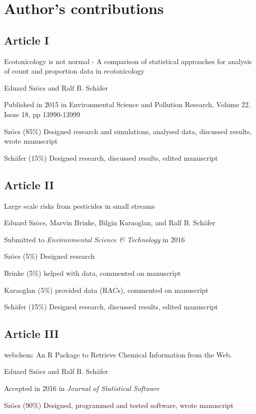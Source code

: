 \chapter{Author's contributions}

\begin{sloppypar}
\section*{Article I}
\small
\begin{description}
    \setlength\itemsep{0.3em}
	\item[Title:] Ecotoxicology is not normal - A comparison of statistical approaches for analysis of count and proportion data in ecotoxicology
	\item[Authors:] Eduard Szöcs and Ralf B. Schäfer
	\item[Status:] Published in 2015 in Environmental Science and Pollution Research, Volume 22, Issue 18, pp 13990-13999
	\item[Contributions:] Szöcs (85\%) Designed research and simulations, analysed data, discussed results, wrote manuscript 

	Schäfer (15\%) Designed research, discussed results, edited manuscript
\end{description}
\normalsize


\section*{Article II}
\small
\begin{description}
    \setlength\itemsep{0.3em}
	\item[Title:] Large scale risks from pesticides in small streams
	\item[Authors:] Eduard Szöcs, Marvin Brinke, Bilgin Karaoglan, and Ralf B. Schäfer
	\item[Status:] Submitted to \emph{Environmental Science \& Technology} in 2016
	\item[Contributions:] Szöcs (5\%) Designed research

	Brinke (5\%) helped with data, commented on manuscript

	Karaoglan (5\%) provided data (RACs), commented on manuscript

	Schäfer (15\%) Designed research, discussed results, edited manuscript
\end{description}
\normalsize


\section*{Article III}
\small
\begin{description}
    \setlength\itemsep{0.3em}
	\item[Title:] webchem: An R Package to Retrieve Chemical Information from the Web.
	\item[Authors:] Eduard Szöcs and Ralf B. Schäfer
	\item[Status:] Accepted in 2016 in \emph{Journal of Statistical Software}
	\item[Contributions:] Szöcs (90\%) Designed, programmed and tested software, wrote manuscript


\end{description}
\end{sloppypar}
